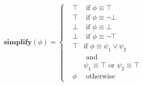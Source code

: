 \documentclass[10pt,a4paper]{article}
\begin{document}
\begin{align*}
\mathbf{simplify}(\phi) = \left\{
\begin{aligned}
&\top &\text{ if } \phi \equiv \top \\
&\top &\text{ if } \phi \equiv \neg \bot \\
&\bot &\text{ if } \phi \equiv \bot \\
&\bot &\text{ if } \phi \equiv \neg \top \\
&\top &\text {if } \phi \equiv \psi_1 \vee \psi_2 \\
& &\text{ and } \\ & & \psi_1 \equiv \top \text{ or } \psi_2 \equiv \top \\
&\phi &\text{ otherwise}
\end{aligned} \right. \\
\end{align*}

\end{document}
